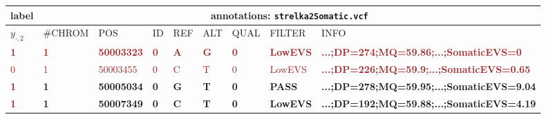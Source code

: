 \begin{tabular}{|l|llllllll|}
\hline
\footnotesize label &
\multicolumn{8}{|c|}{\footnotesize annotations: \texttt{strelka2Somatic.vcf}} \\
\hline
\(y_{\cdot,2}\) & \#CHROM & POS & ID & REF & ALT & QUAL & FILTER & INFO \\
\bfseries \textcolor{brown}{1} &
\bfseries \textcolor{brown}{1} &
\bfseries \textcolor{brown}{50003323} &
\bfseries \textcolor{brown}{0} &
\bfseries \textcolor{brown}{A} &
\bfseries \textcolor{brown}{G} &
\bfseries \textcolor{brown}{0} &
\bfseries \textcolor{brown}{LowEVS} &
\bfseries \textcolor{brown}{...;DP=274;MQ=59.86;...;SomaticEVS=0} \\
\textcolor{brown}{0} &
\textcolor{brown}{1} &
\textcolor{brown}{50003455} &
\textcolor{brown}{0} &
\textcolor{brown}{C} &
\textcolor{brown}{T} &
\textcolor{brown}{0} &
\textcolor{brown}{LowEVS} &
\bfseries \textcolor{brown}{...;DP=226;MQ=59.9;...;SomaticEVS=0.65} \\
\bfseries \textcolor{brown}{1} &
\bfseries \textcolor{cyan!50!brown}{1} &
\bfseries \textcolor{cyan!50!brown}{50005034} &
\bfseries \textcolor{cyan!50!brown}{0} &
\bfseries \textcolor{cyan!50!brown}{G} &
\bfseries \textcolor{cyan!50!brown}{T} &
\bfseries \textcolor{cyan!50!brown}{0} &
\bfseries \textcolor{cyan!50!brown}{PASS} &
\bfseries \textcolor{cyan!50!brown}{...;DP=278;MQ=59.95;...;SomaticEVS=9.04} \\
\bfseries \textcolor{brown}{1} &
\bfseries \textcolor{cyan!50!brown}{1} &
\bfseries \textcolor{cyan!50!brown}{50007349} &
\bfseries \textcolor{cyan!50!brown}{0} &
\bfseries \textcolor{cyan!50!brown}{C} &
\bfseries \textcolor{cyan!50!brown}{T} &
\bfseries \textcolor{cyan!50!brown}{0} &
\bfseries \textcolor{cyan!50!brown}{LowEVS} &
\bfseries \textcolor{cyan!50!brown}{...;DP=192;MQ=59.88;...;SomaticEVS=4.19} \\
\hline
\end{tabular}
\normalsize
